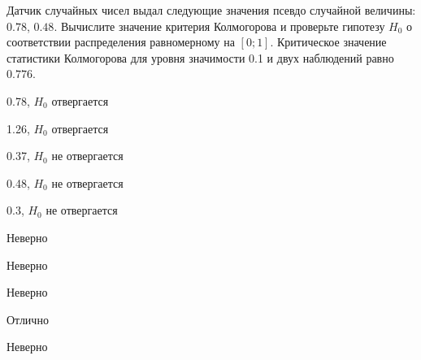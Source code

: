 
\begin{question}
Датчик случайных чисел выдал следующие значения псевдо случайной
величины: \(0.78\), \(0.48\). Вычислите значение критерия Колмогорова и
проверьте гипотезу \(H_0\) о соответствии распределения равномерному на
\([0;1]\). Критическое значение статистики Колмогорова для уровня
значимости 0.1 и двух наблюдений равно \(0.776\).
\begin{answerlist}
  \item 0.78, \(H_0\) отвергается
  \item 1.26, \(H_0\) отвергается
  \item 0.37, \(H_0\) не отвергается
  \item 0.48, \(H_0\) не отвергается
  \item 0.3, \(H_0\) не отвергается
\end{answerlist}
\end{question}

\begin{solution}
\begin{answerlist}
  \item Неверно
  \item Неверно
  \item Неверно
  \item Отлично
  \item Неверно
\end{answerlist}
\end{solution}


